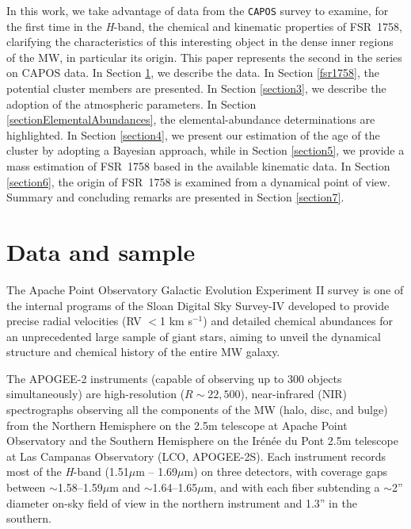 \documentclass[longauth]{aa} %
\begin{document}
In this work, we take advantage of data from the \texttt{CAPOS} survey \citep[][]{Geisler2021} to examine, for the first time in the \textit{H}-band, the chemical and kinematic properties of  FSR~1758, clarifying the characteristics of this interesting object in the dense inner regions of the MW, in particular its origin. This paper represents the second in the series on CAPOS data. In Section \ref{section2}, we describe the data. In Section \ref{fsr1758}, the potential cluster members are presented. In Section \ref{section3}, we describe the adoption of the atmospheric parameters. In Section \ref{sectionElementalAbundances}, the elemental-abundance determinations are highlighted. In Section \ref{section4}, we present our estimation of the age of the cluster by adopting a Bayesian approach, while in Section \ref{section5}, we provide a mass estimation of FSR~1758 based in the available kinematic data. In Section \ref{section6}, the origin of FSR~1758 is examined from a dynamical point of view. Summary and concluding remarks are presented in Section \ref{section7}.

\section{Data and sample}
\label{section2}

The Apache Point Observatory Galactic Evolution Experiment II survey \citep[APOGEE-2;][]{Majewski2017} is one of the internal programs of the Sloan Digital Sky Survey-IV \citep{Blanton2017, Ahumada2020} developed to provide precise radial velocities (RV $<$1 km s$^{-1}$) and detailed chemical abundances for an unprecedented large sample of giant stars, aiming to unveil the dynamical structure and chemical history of the entire MW galaxy. 

The APOGEE-2 instruments (capable of observing up to 300 objects simultaneously) are high-resolution ($R\sim22,500$), near-infrared (NIR) spectrographs \citep{Wilson2019} observing all the components of the MW (halo, disc, and bulge) from the Northern Hemisphere on the 2.5m telescope at Apache Point Observatory \citep[APO, APOGEE-2N;][]{Gunn2006} and the Southern Hemisphere on the Ir\'en\'ee du Pont 2.5m telescope \citep[][]{Bowen1973} at Las Campanas Observatory (LCO, APOGEE-2S). Each instrument records most of the \textit{H}-band (1.51$\mu$m -- 1.69$\mu$m) on three detectors, with coverage gaps between $\sim$1.58--1.59$\mu$m and $\sim$1.64--1.65$\mu$m, and with each fiber subtending a $\sim$2'' diameter on-sky field of view in the northern instrument and 1.3'' in the southern.
\end{document}
